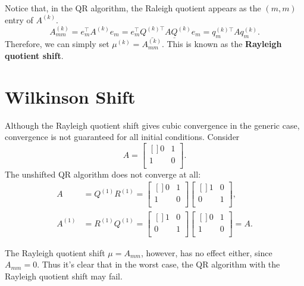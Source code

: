 Notice that, in the QR algorithm, the Raleigh quotient appears as the $ (m,m) $ entry of $A^{(k)}$. 
\[
    A^{(k)}_{mm} = e_m^\top  A^{(k)}e_m = e_m^\top  \underline{Q^{(k)\top}} A \underline{Q}^{(k)} e_m = q_m^{(k)\top} A q_m^{(k)}. 
\]
Therefore, we can simply set $ \mu^{(k)}= A_{mm} ^{(k)} $. This is known as the \textbf{Rayleigh quotient shift}. 

\section{Wilkinson Shift}
Although the Rayleigh quotient shift gives cubic convergence in the generic case, convergence is not guaranteed for all initial conditions. Consider 
\[
    A = \begin{bmatrix}[] 
        0 &  1 \\
        1 &  0 \\
    \end{bmatrix}.  
\] 
The unshifted QR algorithm does not converge at all: 
\begin{align*}
    A &= Q^{(1)}R^{(1)} = \begin{bmatrix}[] 
        0 & 1 \\
        1 &  0 \\
    \end{bmatrix} \begin{bmatrix}[] 
        1 &  0 \\
        0 &  1 \\
    \end{bmatrix}, \\ 
    A^{(1)} &= R^{(1)}Q^{(1)} = \begin{bmatrix}[] 
        1 &  0 \\
        0 &  1 \\
    \end{bmatrix}\begin{bmatrix}[] 
        0 &  1 \\
        1 &  0 \\
    \end{bmatrix} = A.   
\end{align*}

The Rayleigh quotient shift $ \mu = A_{mm} $, however, has no effect either, since $ A_{ mm } =0 $. Thus it's clear that in the worst case, the QR algorithm with the Rayleigh quotient shift may fail.  

